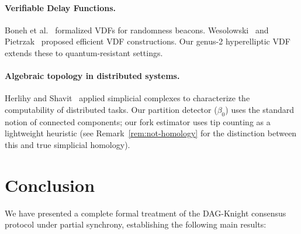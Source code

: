 \documentclass[11pt,a4paper]{article}
\theoremstyle{definition}
\theoremstyle{remark}
\newcommand{\DK}{\textsf{DAG-Knight}}
\begin{document}
\paragraph{Verifiable Delay Functions.}
Boneh et al.~\cite{boneh2018vdf} formalized VDFs for randomness beacons.
Wesolowski~\cite{wesolowski2019efficient} and
Pietrzak~\cite{pietrzak2019simple} proposed efficient VDF constructions.
Our genus-2 hyperelliptic VDF extends these to quantum-resistant settings.

\paragraph{Algebraic topology in distributed systems.}
Herlihy and Shavit~\cite{herlihy1999topological} applied simplicial
complexes to characterize the computability of distributed tasks.
Our partition detector ($\beta_0$) uses the standard notion of connected
components; our fork estimator uses tip counting as a lightweight
heuristic (see Remark~\ref{rem:not-homology} for the distinction between
this and true simplicial homology).

\section{Conclusion}\label{sec:conclusion}

We have presented a complete formal treatment of the \DK{} consensus
protocol under partial synchrony, establishing the following main results:
\end{document}
